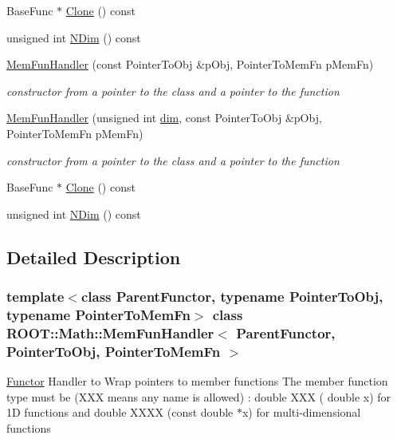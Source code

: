 \begin{DoxyCompactItemize}
Base\+Func $\ast$ \mbox{\hyperlink{classROOT_1_1Math_1_1MemFunHandler_a71089a87a2f1ca482d176caca602f16c}{Clone}} () const
\item 
unsigned int \mbox{\hyperlink{classROOT_1_1Math_1_1MemFunHandler_a6685da729cc491d0ee9b3857a400d98c}{N\+Dim}} () const
\item 
\mbox{\hyperlink{classROOT_1_1Math_1_1MemFunHandler_a714877219c36aab344b3785be06affcc}{Mem\+Fun\+Handler}} (const Pointer\+To\+Obj \&p\+Obj, Pointer\+To\+Mem\+Fn p\+Mem\+Fn)
\begin{DoxyCompactList}\small\item\em constructor from a pointer to the class and a pointer to the function \end{DoxyCompactList}\item 
\mbox{\hyperlink{classROOT_1_1Math_1_1MemFunHandler_ae160c1f60f6681ba29ce9e2bf3654b24}{Mem\+Fun\+Handler}} (unsigned int \mbox{\hyperlink{adat__devel_2lib_2hadron_2irrep__util_8cc_a70b5e28b5bc3d1b63a7435c5fe50b837}{dim}}, const Pointer\+To\+Obj \&p\+Obj, Pointer\+To\+Mem\+Fn p\+Mem\+Fn)
\begin{DoxyCompactList}\small\item\em constructor from a pointer to the class and a pointer to the function \end{DoxyCompactList}\item 
Base\+Func $\ast$ \mbox{\hyperlink{classROOT_1_1Math_1_1MemFunHandler_a71089a87a2f1ca482d176caca602f16c}{Clone}} () const
\item 
unsigned int \mbox{\hyperlink{classROOT_1_1Math_1_1MemFunHandler_a6685da729cc491d0ee9b3857a400d98c}{N\+Dim}} () const
\end{DoxyCompactItemize}


\subsection{Detailed Description}
\subsubsection*{template$<$class Parent\+Functor, typename Pointer\+To\+Obj, typename Pointer\+To\+Mem\+Fn$>$\newline
class R\+O\+O\+T\+::\+Math\+::\+Mem\+Fun\+Handler$<$ Parent\+Functor, Pointer\+To\+Obj, Pointer\+To\+Mem\+Fn $>$}

\mbox{\hyperlink{classROOT_1_1Math_1_1Functor}{Functor}} Handler to Wrap pointers to member functions The member function type must be (X\+XX means any name is allowed) \+: double X\+XX ( double x) for 1D functions and double X\+X\+XX (const double $\ast$x) for multi-\/dimensional functions 

